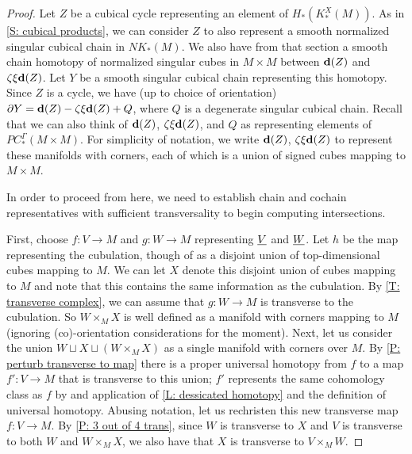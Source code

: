 \documentclass{amsart}
\begin{document}
\begin{proof}
Let $Z$ be a cubical cycle representing an element of $H_*(K_*^X(M))$. As in \cref{S: cubical products}, we can consider $Z$ to also represent a smooth normalized singular cubical chain in $NK_*(M)$. We also have from that section a smooth chain homotopy of normalized singular cubes  in $M\times M$ between $\mathbf{d}(Z)$ and $\zeta\xi\mathbf{d}(Z)$. Let $Y$ be a smooth singular cubical chain representing this homotopy. Since $Z$ is a cycle, we have (up to choice of orientation) $\partial Y=\mathbf{d}(Z)-\zeta\xi\mathbf{d}(Z)+Q$, where $Q$ is a degenerate singular cubical chain. Recall that we can also think of $\mathbf{d}(Z)$, $\zeta\xi\mathbf{d}(Z)$, and $Q$ as representing elements of $PC^\Gamma_*(M\times M)$. For simplicity of notation, we write $\mathbf{d}(Z)$, $\zeta\xi\mathbf{d}(Z)$ to represent these manifolds with corners, each of which is a union of signed cubes mapping to $M\times M$. 

In order to proceed from here, we need to establish chain and cochain representatives with sufficient transversality to begin computing intersections. 

First, choose $f:V\to M$ and $g:W\to M$ representing $\underline{V}$ and $\underline{W}$. Let $h$ be the map representing the cubulation, though of as a disjoint union of top-dimensional cubes mapping to $M$. We can let $X$ denote this disjoint union of cubes mapping to $M$ and note that this contains the same information as the cubulation. By \cref{T: transverse complex}, we can assume that $g:W\to M$ is transverse to the cubulation. So $W\times_MX$ is well defined as a manifold with corners mapping to $M$ (ignoring (co)-orientation considerations for the moment). 
Next, let us consider the union $W\sqcup X\sqcup (W\times_M X)$ as a single manifold with corners over $M$. By \cref{P: perturb transverse to map} there is a proper universal homotopy from $f$ to a map $f':V\to M$ that is transverse to this union; $f'$ represents the same cohomology class as $f$ by and application of \cref{L: dessicated homotopy} and the definition of universal homotopy. Abusing notation, let us rechristen this new transverse map $f:V\to M$.  By \cref{P: 3 out of 4 trans}, since $W$ is transverse to $X$ and $V$ is transverse to both $W$ and $W\times_MX$, we also have that $X$ is transverse to $V\times_M W$. 


\end{proof}
\end{document}
